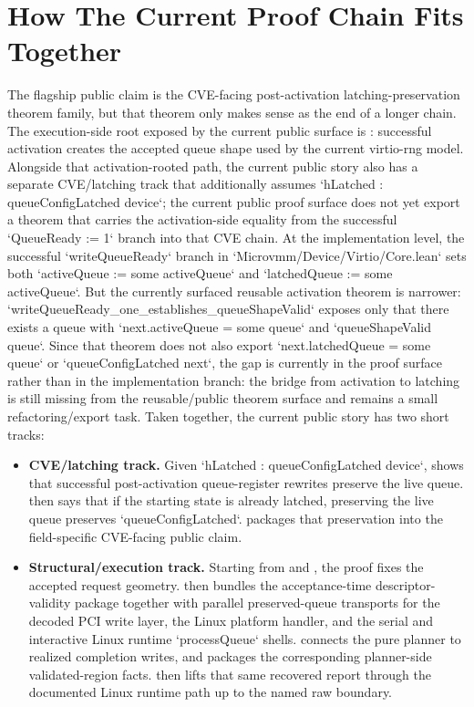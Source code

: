 \section{How The Current Proof Chain Fits Together}

The flagship public claim is the CVE-facing post-activation latching-preservation theorem family, but that theorem only makes sense as the end of a longer chain.
The execution-side root exposed by the current public surface is : successful activation creates the accepted queue shape used by the current virtio-rng model.
Alongside that activation-rooted path, the current public story also has a separate CVE/latching track that additionally assumes `hLatched : queueConfigLatched device`; the current public proof surface does not yet export a theorem that carries the activation-side equality from the successful `QueueReady := 1` branch into that CVE chain.
At the implementation level, the successful `writeQueueReady` branch in `Microvmm/Device/Virtio/Core.lean` sets both `activeQueue := some activeQueue` and `latchedQueue := some activeQueue`.
But the currently surfaced reusable activation theorem is narrower: `writeQueueReady_one_establishes_queueShapeValid` exposes only that there exists a queue with `next.activeQueue = some queue` and `queueShapeValid queue`.
Since that theorem does not also export `next.latchedQueue = some queue` or `queueConfigLatched next`, the gap is currently in the proof surface rather than in the implementation branch: the bridge from activation to latching is still missing from the reusable/public theorem surface and remains a small refactoring/export task.
Taken together, the current public story has two short tracks:

\begin{itemize}
\item \textbf{CVE/latching track.} Given `hLatched : queueConfigLatched device`,  shows that successful post-activation queue-register rewrites preserve the live queue.  then says that if the starting state is already latched, preserving the live queue preserves `queueConfigLatched`.  packages that preservation into the field-specific CVE-facing public claim.
\item \textbf{Structural/execution track.} Starting from  and , the proof fixes the accepted request geometry.  then bundles the acceptance-time descriptor-validity package together with parallel preserved-queue transports for the decoded PCI write layer, the Linux platform handler, and the serial and interactive Linux runtime `processQueue` shells.  connects the pure planner to realized completion writes, and  packages the corresponding planner-side validated-region facts.  then lifts that same recovered report through the documented Linux runtime path up to the named raw boundary.
\end{itemize}

